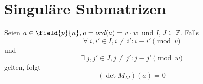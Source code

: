 \section{Singuläre Submatrizen}

\begin{lemma} \label{lemma:equal-columns}
    Seien $a \in \field{p}{n}, o = ord(a) = v\cdot w$ und $I,J \subseteq \mathbb{Z}$.
    Falls
    \begin{equation*}
        \forall \; i, i' \in I, i \neq i': i \equiv i' \pmod v
    \end{equation*}
    und
    \begin{equation*}
        \exists \; j, j' \in J, j \neq j':  j \equiv j' \pmod w
    \end{equation*}
    gelten, folgt
    \begin{equation*}
        (\det M_{IJ})(a) = 0
    \end{equation*}
\end{lemma}

